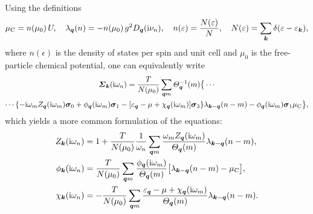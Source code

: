 Using the definitions
%
\begin{equation} \label{coupling strengths}
    \mu \sb{\text{C}} = n(\mu_0) \, U,
        \quad
    \lambda_{\boldsymbol q}(n) = -n(\mu_0) \, g^2 D_{\boldsymbol q}(\mathrm i \nu_n),
        \quad
    n(\varepsilon) = \frac{N(\varepsilon)} N,
        \quad
    N(\varepsilon) = \sum_{\boldsymbol k} \delta(\varepsilon - \varepsilon_{\boldsymbol k}),
\end{equation}
%
where $n(\epsilon)$ is the density of states per spin and unit cell and $\mu_0$
is the free-particle chemical potential, one can equivalently write
%
\begin{multline*}
    \boldsymbol {\varSigma}_{\boldsymbol k} (\mathrm i \omega_n)
    = \frac T {N(\mu_0)} \sum_{\boldsymbol q m}
    \varTheta_{\boldsymbol q}^{-1}(m) \big \{ \cdots
        \\
        \cdots \{
            - \mathrm i \omega_m Z_{\boldsymbol q}(\mathrm i \omega_m) \boldsymbol \sigma_0
            + \phi_{\boldsymbol q}(\mathrm i \omega_m) \boldsymbol \sigma_1
            - [\varepsilon_{\boldsymbol q} - \mu + \chi_{\boldsymbol q}(\mathrm i \omega_m)]
            \boldsymbol \sigma_3
            \}
        \lambda_{\boldsymbol k - \boldsymbol q}(n - m)
        - \phi_{\boldsymbol q}(\mathrm i \omega_m) \boldsymbol \sigma_1 \mu \sb{\text{C}}
    \big \},
\end{multline*}
%
which yields a more common formulation of the  equations:
%
\begin{subequations} \label{Eliashberg equations}
    \begin{align}
        Z_{\boldsymbol k}(\mathrm i \omega_n) &= 1 + \frac T {N(\mu_0)} \frac 1 {\omega_n}
        \sum_{\boldsymbol q m} \frac
            {\omega_m Z_{\boldsymbol q}(\mathrm i \omega_m)}
            {\varTheta_{\boldsymbol q}(m)}
        \lambda_{\boldsymbol k - \boldsymbol q}(n - m),
        \\
        \phi_{\boldsymbol k}(\mathrm i \omega_n) &= \frac T {N(\mu_0)}
        \sum_{\boldsymbol q m} \frac
            {\phi_{\boldsymbol q}(\mathrm i \omega_m)}
            {\varTheta_{\boldsymbol q}(m)}
        \big[
            \lambda_{\boldsymbol k - \boldsymbol q}(n - m) - \mu \sb{\text{C}}
        \big],
        \\
        \chi_{\boldsymbol k}(\mathrm i \omega_n) &= -\frac T {N(\mu_0)}
        \sum_{\boldsymbol q m} \frac
            {\varepsilon_{\boldsymbol q} - \mu + \chi_{\boldsymbol q}(\mathrm i \omega_m)}
            {\varTheta_{\boldsymbol q}(m)}
        \lambda_{\boldsymbol k - \boldsymbol q}(n - m).
    \end{align}
\end{subequations}

